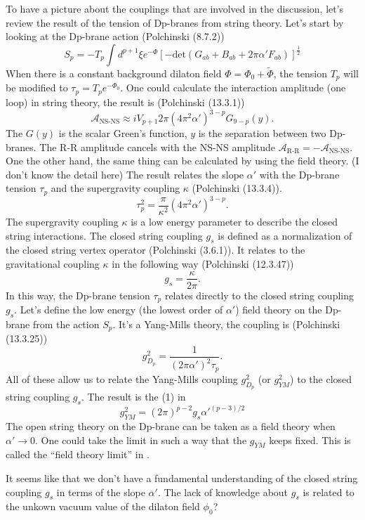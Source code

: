 To have a picture about the couplings that are involved in the discussion,
let's review the result of the tension of Dp-branes from string theory.
Let's start by looking at the Dp-brane action (Polchinski (8.7.2))
\begin{equation}
	S_p = - T_p \int d^{p+1} \xi e^{-\Phi}	
	\left[ - \mathrm{det} (G_{ab} + B_{ab} + 
	2\pi \alpha' F_{ab}) \right]^{\frac{1}{2}} 
\end{equation}
When there is a constant background dilaton field $\Phi = \Phi_0 + \tilde{\Phi}$,
the tension $T_p$ will be modified to $\tau_p = T_p e^{-\Phi_0}$.
One could calculate the interaction amplitude (one loop) in string theory,
the result is (Polchinski (13.3.1))
\begin{equation}
	\mathcal{A}_{\text{NS-NS}} \approx
	i V_{p+1} 2\pi (4\pi^2\alpha')^{3-p} G_{9-p}(y).
\end{equation}
The $G(y)$ is the scalar Green's function, $y$ is the separation between two Dp-branes.
The R-R amplitude cancels with the NS-NS amplitude $\mathcal{A}_{\text{R-R}}
=- \mathcal{A}_{\text{NS-NS}}$.
One the other hand, the same thing can be calculated by using the field theory.
(I don't know the detail here)
The result relates the slope $\alpha'$ with the Dp-brane tension $\tau_p$
and the supergravity coupling $\kappa$ (Polchinski (13.3.4)).
\begin{equation}
	\tau_p^2 = \frac{\pi}{\kappa^2} (4\pi^2 \alpha')^{3-p}	.
\end{equation}
The supergravity coupling $\kappa$ is a low energy parameter to describe the closed string interactions.
The closed string coupling $g_s$ is defined as a normalization of the closed string vertex operator (Polchinski (3.6.1)).
It relates to the gravitational coupling $\kappa$ in the following way
(Polchinski (12.3.47))
\[
	g_{s} = \frac{\kappa}{2\pi}
.\] 
In this way, the Dp-brane tension $\tau_p$ relates directly to the closed string coupling $g_s$.
Let's define the low energy (the lowest order of $\alpha'$) field theory
on the Dp-brane from the action $S_p$.
It's a Yang-Mills theory, the coupling is (Polchinski (13.3.25))
\[
	g_{D_p}^2 = \frac{1}{(2\pi\alpha')^2\tau_p}
.\] 
All of these allow us to relate the Yang-Mills coupling
$g_{D_p}^2$ (or $g_{YM}^2$) to the closed string coupling $g_s$.
The result is the (1) in 
\begin{equation}
	g_{YM}^2 = (2\pi)^{p-2} g_s {\alpha'}^{(p-3) / 2}	
\end{equation}
The open string theory on the Dp-brane can be taken as a field theory
when $\alpha'\to 0$.
One could take the limit in such a way that the $g_{YM}$ keeps fixed.
This is called the ``field theory limit'' in .
\begin{question}
It seems like that we don't have a fundamental understanding of the closed string coupling $g_s$ in terms of the slope $\alpha'$.	
The lack of knowledge about $g_s$ is related to the unkown vacuum value of the dilaton field $\phi_0$?
\end{question}

